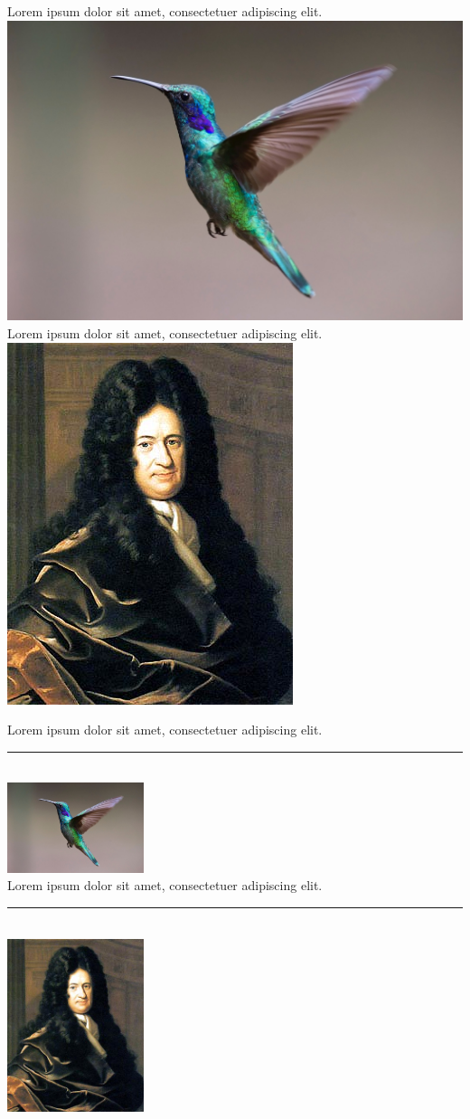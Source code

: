 \documentclass[12pt,a4paper,twoside]{article}
\begin{document}
\noindent Lorem ipsum dolor sit amet, consectetuer adipiscing elit.\\
\noindent\includegraphics[width=.4\textwidth]{images/bird.jpg}\\
\noindent Lorem ipsum dolor sit amet, consectetuer adipiscing elit.\\
\noindent\includegraphics[width=.4\textwidth]{images/GWLeibniz.png}

\noindent Lorem ipsum dolor sit amet, consectetuer adipiscing elit.\\
\noindent\rule[2mm]{4cm}{3mm}\\
\noindent\includegraphics[width=4cm]{images/bird.jpg}\\
\noindent Lorem ipsum dolor sit amet, consectetuer adipiscing elit.\\
\noindent\rule[10pt]{4cm}{3mm}\\
\noindent\includegraphics[width=4cm]{images/GWLeibniz.png}
\end{document}
